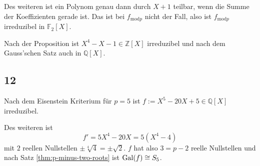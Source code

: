 Des weiteren ist ein Polynom genau dann durch $X+1$ teilbar, wenn die Summe der Koeffizienten gerade ist. 
Das ist bei $f_{\mathrm{mod }p}$ nicht der Fall, also ist $f_{\mathrm{mod }p}$ irreduzibel in $\mathbb{F}_2[X]$.

Nach der Proposition ist $X^{4} - X - 1 \in \mathbb{Z}[X]$ irreduzibel und nach dem Gauss'schen Satz auch in $\mathbb{Q}[X]$.

\subsection*{12}
Nach dem Eisenstein Kriterium für $p = 5$ ist $f := X^{5} - 20 X + 5 \in \mathbb{Q}[X]$ irreduzibel.

Des weiteren ist 
$$f' = 5X^{4} - 20X = 5(X^{4} - 4)$$
mit $2$ reellen Nullstellen $\pm \sqrt[4]{4} = \pm \sqrt{2}$.
$f$ hat also $3 = p-2$ reelle Nullstellen und nach Satz \ref{thm:p-minus-two-roots} ist $\operatorname{Gal}(f) \cong S_5$.





